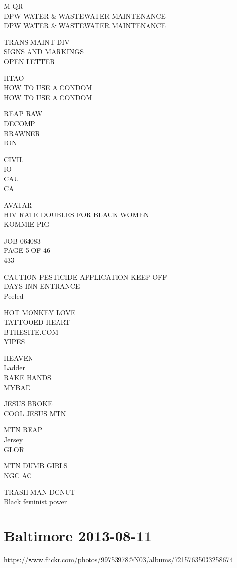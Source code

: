 \documentclass[10pt,letterpaper]{article}
\begin{document}
M QR\\
DPW WATER \& WASTEWATER MAINTENANCE\\
DPW WATER \& WASTEWATER MAINTENANCE

TRANS MAINT DIV\\
SIGNS AND MARKINGS\\
OPEN LETTER

HTAO\\
HOW TO USE A CONDOM\\
HOW TO USE A CONDOM

REAP RAW\\
DECOMP\\
BRAWNER\\
ION

CIVIL\\
IO\\
CAU\\
CA

AVATAR\\
HIV RATE DOUBLES FOR BLACK WOMEN\\
KOMMIE PIG

JOB 064083\\
PAGE 5 OF 46\\
433

CAUTION PESTICIDE APPLICATION KEEP OFF\\
DAYS INN ENTRANCE\\
Peeled

HOT MONKEY LOVE\\
TATTOOED HEART\\
BTHESITE.COM\\
YIPES

HEAVEN\\
Ladder\\
RAKE HANDS\\
MYBAD

JESUS BROKE\\
COOL JESUS MTN

MTN REAP\\
Jersey\\
GLOR

MTN DUMB GIRLS\\
NGC AC

TRASH MAN DONUT\\
Black feminist power


\section*{Baltimore 2013-08-11}

\url{https://www.flickr.com/photos/99753978@N03/albums/72157635033258674}
\end{document}

